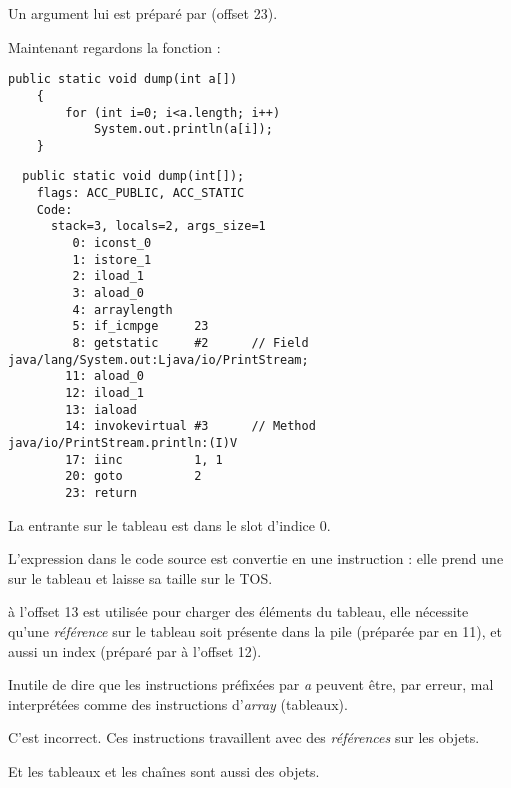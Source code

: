 Un argument lui est préparé par  (offset 23).

Maintenant regardons la fonction :

\begin{lstlisting}[style=customjava]
	public static void dump(int a[])
	{
		for (int i=0; i<a.length; i++)
			System.out.println(a[i]);
	}
\end{lstlisting}

\begin{lstlisting}
  public static void dump(int[]);
    flags: ACC_PUBLIC, ACC_STATIC
    Code:
      stack=3, locals=2, args_size=1
         0: iconst_0      
         1: istore_1      
         2: iload_1       
         3: aload_0       
         4: arraylength   
         5: if_icmpge     23
         8: getstatic     #2      // Field java/lang/System.out:Ljava/io/PrintStream;
        11: aload_0       
        12: iload_1       
        13: iaload        
        14: invokevirtual #3      // Method java/io/PrintStream.println:(I)V
        17: iinc          1, 1
        20: goto          2
        23: return        
\end{lstlisting}

La  entrante sur le tableau est dans le slot d'indice 0.

L'expression  dans le code source est convertie en une instruction :
elle prend une  sur le tableau et laisse sa taille sur le \ac{TOS}.

 à l'offset 13 est utilisée pour charger des éléments du tableau,
elle nécessite qu'une \emph{référence} sur le tableau soit présente
dans la pile (préparée par  en 11),
et aussi un index (préparé par  à l'offset 12).

Inutile de dire que les instructions préfixées par \emph{a} peuvent être, par erreur,
mal interprétées comme des instructions d'\emph{array} (tableaux).

C'est incorrect.
Ces instructions travaillent avec des \emph{références} sur les objets.

Et les tableaux et les chaînes sont aussi des objets.

